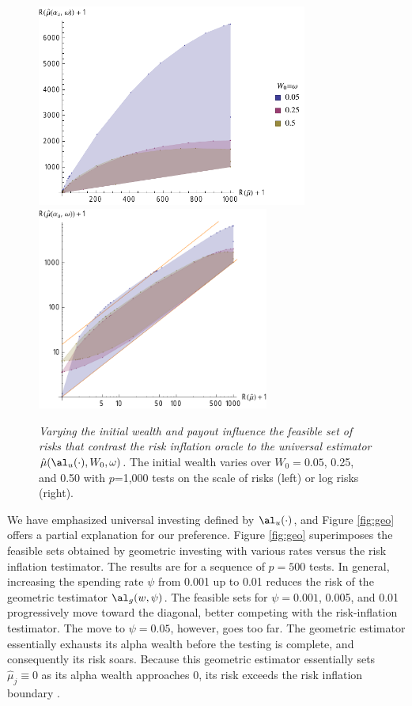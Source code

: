 \documentclass[12pt]{article}
\newcommand{\uTest}{\mbox{$\hat\mu(\al_u(\cdot),W_0,\omega)$}}
\begin{document}
\begin{figure}
 \caption{ \label{fig:univRI} {\sl Varying the initial wealth and payout influence the 
  feasible set of risks that contrast the risk inflation oracle to the universal estimator
 \uTest.} The initial wealth varies over $W_0=0.05$,
 0.25, and 0.50 with $p$=1,000 tests on the scale of risks (left) or log risks
 (right).  }

 \vspace{0.1in}
 \centerline{
 \includegraphics[width=3.5in]{figures/univVsRI}
 \includegraphics[width=3.0in]{figures/univVsRILog}    }
 \vspace{0.2in}
\end{figure}


 We have emphasized universal investing defined by $\al_u(\cdot)$, and Figure
 \ref{fig:geo} offers a partial explanation for our preference.  Figure \ref{fig:geo}
 superimposes the feasible sets obtained by geometric investing with various rates versus
 the risk inflation testimator.  The results are for a sequence of $p = 500$ tests.  In
 general, increasing the spending rate $\psi$ from 0.001 up to 0.01 reduces the risk of
 the geometric testimator $\al_g(w,\psi)$. The feasible sets for $\psi=0.001$, 0.005, and
 0.01 progressively move toward the diagonal, better competing with the risk-inflation
 testimator.  The move to $\psi = 0.05$, however, goes too far.  The geometric estimator
 essentially exhausts its alpha wealth before the testing is complete, and consequently
 its risk soars.  Because this geometric estimator essentially sets $\hat\mu_j \equiv 0$
 as its alpha wealth approaches 0, its risk exceeds the risk inflation boundary
 .
\end{document}
